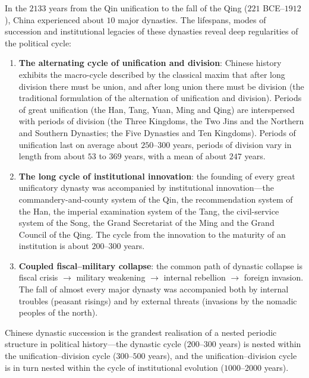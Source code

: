 \begin{theorem}\label{thm:chinese_dynasty_cycle}
In the $2133$ years from the Qin unification to the fall of the Qing ($221$ BCE--$1912$), China experienced about $10$ major dynasties. The lifespans, modes of succession and institutional legacies of these dynasties reveal deep regularities of the political cycle:
\begin{enumerate}[label=(\roman*)]
    \item \textbf{The alternating cycle of unification and division}: Chinese history exhibits the macro-cycle described by the classical maxim that after long division there must be union, and after long union there must be division (the traditional formulation of the alternation of unification and division). Periods of great unification (the Han, Tang, Yuan, Ming and Qing) are interspersed with periods of division (the Three Kingdoms, the Two Jins and the Northern and Southern Dynasties; the Five Dynasties and Ten Kingdoms). Periods of unification last on average about $250$--$300$ years, periods of division vary in length from about $53$ to $369$ years, with a mean of about $247$ years.
    \item \textbf{The long cycle of institutional innovation}: the founding of every great unificatory dynasty was accompanied by institutional innovation---the commandery-and-county system of the Qin, the recommendation system of the Han, the imperial examination system of the Tang, the civil-service system of the Song, the Grand Secretariat of the Ming and the Grand Council of the Qing. The cycle from the innovation to the maturity of an institution is about $200$--$300$ years.
    \item \textbf{Coupled fiscal--military collapse}: the common path of dynastic collapse is fiscal crisis $\to$ military weakening $\to$ internal rebellion $\to$ foreign invasion. The fall of almost every major dynasty was accompanied both by internal troubles (peasant risings) and by external threats (invasions by the nomadic peoples of the north).
\end{enumerate}
Chinese dynastic succession is the grandest realisation of a nested periodic structure in political history---the dynastic cycle ($200$--$300$ years) is nested within the unification--division cycle ($300$--$500$ years), and the unification--division cycle is in turn nested within the cycle of institutional evolution ($1000$--$2000$ years).
\end{theorem}

